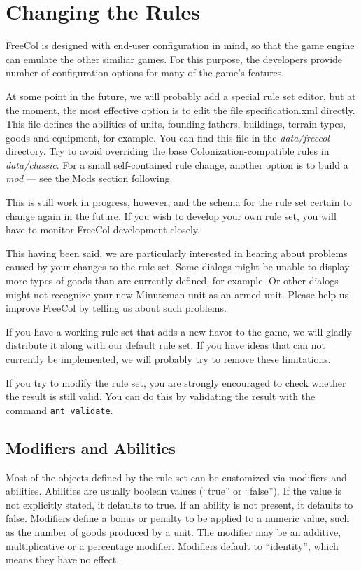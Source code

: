 \documentclass[12pt]{book}
\begin{document}
\hypertarget{Changing the Rules}{\chapter{Changing the Rules}}

FreeCol is designed with end-user configuration in mind, so that the game
engine can emulate the other similiar games. For this purpose, the developers
provide number of configuration options for many of the game's features.

At some point in the future, we will probably add a special rule set
editor, but at the moment, the most effective option is to edit the file
specification.xml directly. This file defines the abilities of units,
founding fathers, buildings, terrain types, goods and equipment, for
example. You can find this file in the \textit{data/freecol}
directory. Try to avoid overriding the base Colonization-compatible
rules in \textit{data/classic}. For a small self-contained rule
change, another option is to build a \emph{mod} --- see the Mods
section following.

This is still work in progress, however, and the schema for the rule
set certain to change again in the future. If you wish to develop your
own rule set, you will have to monitor FreeCol development closely.

This having been said, we are particularly interested in hearing about
problems caused by your changes to the rule set. Some dialogs might be
unable to display more types of goods than are currently defined, for
example. Or other dialogs might not recognize your new Minuteman unit
as an armed unit. Please help us improve FreeCol by telling us about
such problems.

If you have a working rule set that adds a new flavor to the game, we
will gladly distribute it along with our default rule set. If you have
ideas that can not currently be implemented, we will probably try to
remove these limitations.

If you try to modify the rule set, you are strongly encouraged to
check whether the result is still valid. You can do this by validating
the result with the command \verb$ant validate$.


\hypertarget{Modifiers and Abilities}{\section{Modifiers and Abilities}}

Most of the objects defined by the rule set can be customized via
modifiers and abilities. Abilities are usually boolean values
(``true'' or ``false''). If the value is not explicitly stated, it
defaults to true. If an ability is not present, it defaults to
false. Modifiers define a bonus or penalty to be applied to a numeric
value, such as the number of goods produced by a unit. The modifier
may be an additive, multiplicative or a percentage modifier. Modifiers
default to ``identity'', which means they have no effect.
\end{document}
